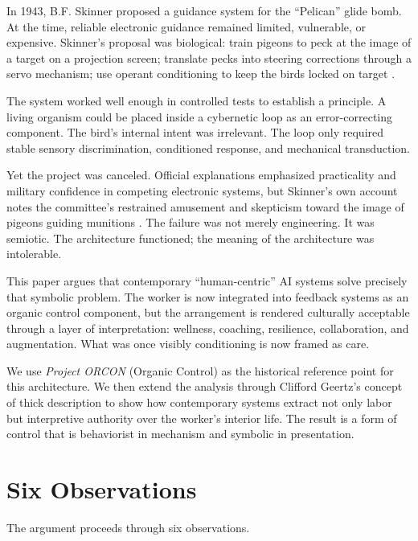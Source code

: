 \documentclass[runningheads]{llncs}
\begin{document}
In 1943, B.F. Skinner proposed a guidance system for the ``Pelican'' glide bomb. At the time, reliable electronic guidance remained limited, vulnerable, or expensive. Skinner's proposal was biological: train pigeons to peck at the image of a target on a projection screen; translate pecks into steering corrections through a servo mechanism; use operant conditioning to keep the birds locked on target \cite{skinner1960pigeons,capshew1993engineering}.

The system worked well enough in controlled tests to establish a principle. A living organism could be placed inside a cybernetic loop as an error-correcting component. The bird's internal intent was irrelevant. The loop only required stable sensory discrimination, conditioned response, and mechanical transduction.

Yet the project was canceled. Official explanations emphasized practicality and military confidence in competing electronic systems, but Skinner's own account notes the committee's restrained amusement and skepticism toward the image of pigeons guiding munitions \cite{skinner1960pigeons}. The failure was not merely engineering. It was semiotic. The architecture functioned; the meaning of the architecture was intolerable.

This paper argues that contemporary ``human-centric'' AI systems solve precisely that symbolic problem. The worker is now integrated into feedback systems as an organic control component, but the arrangement is rendered culturally acceptable through a layer of interpretation: wellness, coaching, resilience, collaboration, and augmentation. What was once visibly conditioning is now framed as care.

We use \emph{Project ORCON} (Organic Control) as the historical reference point for this architecture. We then extend the analysis through Clifford Geertz's concept of thick description \cite{geertz1973interpretation} to show how contemporary systems extract not only labor but interpretive authority over the worker's interior life. The result is a form of control that is behaviorist in mechanism and symbolic in presentation.

\section{Six Observations}

The argument proceeds through six observations.
\end{document}
